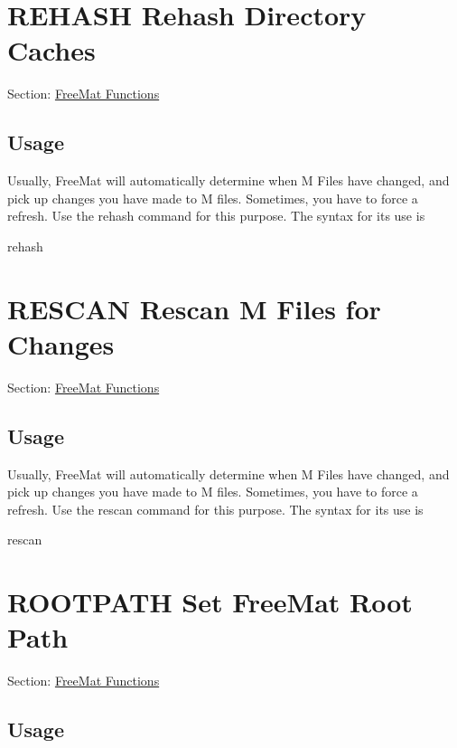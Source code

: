  \hypertarget{freemat_rehash}{}\section{R\-E\-H\-A\-S\-H Rehash Directory Caches}\label{freemat_rehash}
Section\-: \hyperlink{sec_freemat}{Free\-Mat Functions} \hypertarget{vtkwidgets_vtkxyplotwidget_Usage}{}\subsection{Usage}\label{vtkwidgets_vtkxyplotwidget_Usage}
Usually, Free\-Mat will automatically determine when M Files have changed, and pick up changes you have made to M files. Sometimes, you have to force a refresh. Use the {\ttfamily rehash} command for this purpose. The syntax for its use is \begin{DoxyVerb}  rehash
\end{DoxyVerb}
 \hypertarget{freemat_rescan}{}\section{R\-E\-S\-C\-A\-N Rescan M Files for Changes}\label{freemat_rescan}
Section\-: \hyperlink{sec_freemat}{Free\-Mat Functions} \hypertarget{vtkwidgets_vtkxyplotwidget_Usage}{}\subsection{Usage}\label{vtkwidgets_vtkxyplotwidget_Usage}
Usually, Free\-Mat will automatically determine when M Files have changed, and pick up changes you have made to M files. Sometimes, you have to force a refresh. Use the {\ttfamily rescan} command for this purpose. The syntax for its use is \begin{DoxyVerb}  rescan
\end{DoxyVerb}
 \hypertarget{freemat_rootpath}{}\section{R\-O\-O\-T\-P\-A\-T\-H Set Free\-Mat Root Path}\label{freemat_rootpath}
Section\-: \hyperlink{sec_freemat}{Free\-Mat Functions} \hypertarget{vtkwidgets_vtkxyplotwidget_Usage}{}\subsection{Usage}\label{vtkwidgets_vtkxyplotwidget_Usage}
